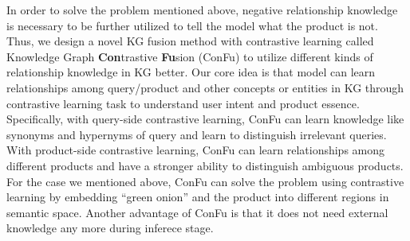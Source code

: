 







In order to solve the problem mentioned above, negative relationship knowledge is necessary to be further utilized to tell the model what the product is not. Thus, we design a novel KG fusion method with contrastive learning called Knowledge Graph \textbf{Con}trastive  \textbf{Fu}sion (ConFu) to utilize different kinds of relationship knowledge in KG better. Our core idea is that model can learn relationships among query/product and other concepts or entities in KG through contrastive learning task to understand user intent and product essence. Specifically, with query-side contrastive learning, ConFu can learn knowledge like synonyms and hypernyms of query and learn to distinguish irrelevant queries. With product-side contrastive learning, ConFu can learn relationships among different products and have a stronger ability to distinguish ambiguous products. 
For the case we mentioned above, ConFu can solve the problem using contrastive learning by embedding ``green onion'' and the product into different regions in semantic space.
Another advantage of ConFu is that it does not need external knowledge any more during inferece stage. 

